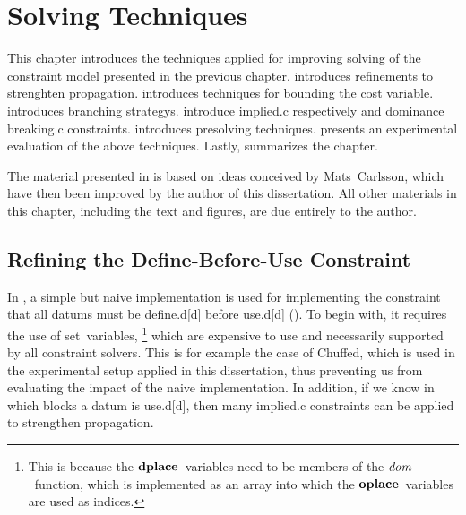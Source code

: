 %

\chapter{Solving Techniques}

This chapter introduces the techniques applied for improving solving of the
\gls{constraint model} presented in the previous chapter.
%
 introduces 
refinements to strenghten \gls{propagation}.
%
 introduces techniques for bounding the \gls{cost
  variable}.
%
 introduces \glspl{branching strategy}.
%
 introduce
\gls{implied.c} respectively  and \gls{dominance
  breaking.c} \glspl{constraint}.
%
 introduces \gls{presolving} techniques.
%
 presents an experimental evaluation of
the above techniques.
%
Lastly,  summarizes the chapter.

The material presented in  is
based on ideas conceived by Mats~Carlsson, which have then been improved by the
author of this dissertation.
%
All other materials in this chapter, including the text and figures, are due
entirely to the author.


\section{Refining the Define-Before-Use Constraint}

In , a simple but naive implementation is used for
implementing the \gls{constraint} that all \glspl{datum} must be
\gls{define.d}[d] before \gls{use.d}[d] ().
%
To begin with, it requires the use of set~\glspl{variable},\!%
%
\footnote{%
  This is because the $\mVar{dplace}$~\glspl{variable} need to be members of the
  $\operatorname{\textrm{\textit{dom}}}$~\gls{function}, which is implemented as an array into which the
  $\mVar{oplace}$~\glspl{variable} are used as indices.%
}
%
which are expensive to use and necessarily supported by all \glspl{constraint
  solver}.
%
This is for example the case of \gls{Chuffed}, which is used in the experimental
setup applied in this dissertation, thus preventing us from evaluating the
impact of the naive implementation.
%
In addition, if we know in which \glspl{block} a \gls{datum} is \gls{use.d}[d],
then many \gls{implied.c} \glspl{constraint} can be applied to strengthen
\gls{propagation}.

